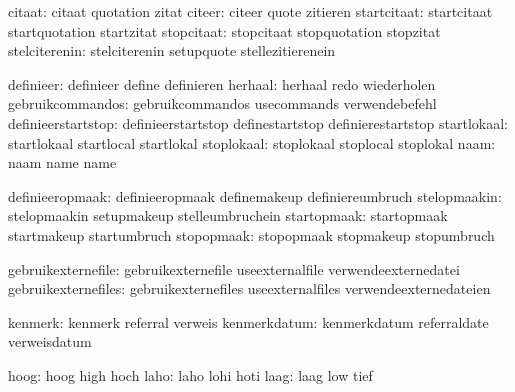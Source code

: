                        citaat:  citaat                       quotation
                                zitat
                       citeer:  citeer                       quote
                                zitieren
                  startcitaat:  startcitaat                  startquotation
                                startzitat
                   stopcitaat:  stopcitaat                   stopquotation
                                stopzitat
                stelciterenin:  stelciterenin                setupquote
                                stellezitierenein

                    definieer:  definieer                    define
                                definieren
                      herhaal:  herhaal                      redo
                                wiederholen
             gebruikcommandos:  gebruikcommandos             usecommands
                                verwendebefehl
           definieerstartstop:  definieerstartstop           definestartstop
                                definierestartstop
                  startlokaal:  startlokaal                  startlocal
                                startlokal
                   stoplokaal:  stoplokaal                   stoplocal
                                stoplokal
                         naam:  naam                         name
                                name

              definieeropmaak:  definieeropmaak              definemakeup
                                definiereumbruch
                 stelopmaakin:  stelopmaakin                 setupmakeup
                                stelleumbruchein
                  startopmaak:  startopmaak                  startmakeup
                                startumbruch
                   stopopmaak:  stopopmaak                   stopmakeup
                                stopumbruch
  
           gebruikexternefile:  gebruikexternefile           useexternalfile
                                verwendeexternedatei
          gebruikexternefiles:  gebruikexternefiles          useexternalfiles
                                verwendeexternedateien

                      kenmerk:  kenmerk                      referral
                                verweis
                 kenmerkdatum:  kenmerkdatum                 referraldate
                                verweisdatum

                         hoog:  hoog                         high
                                hoch
                         laho:  laho                         lohi
                                hoti
                         laag:  laag                         low
                                tief

